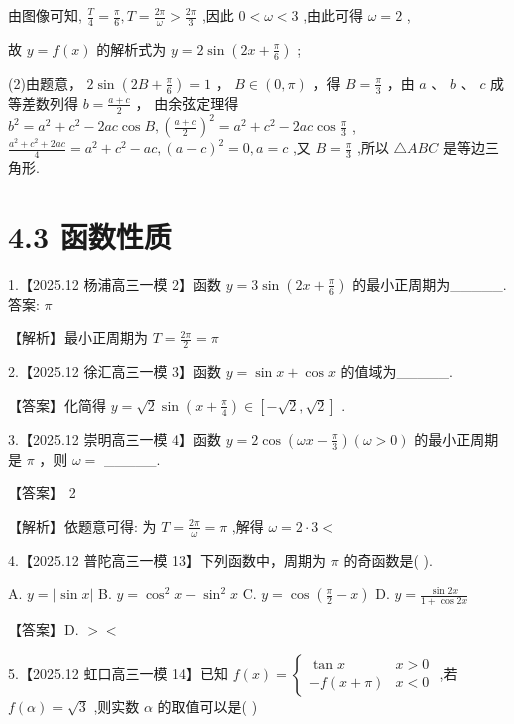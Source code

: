 \documentclass[10pt]{article}
\begin{document}
由图像可知, \(\frac{T}{4} = \frac{\pi }{6},T = \frac{2\pi }{\omega } > \frac{2\pi }{3}\) ,因此 \(0 < \omega  < 3\) ,由此可得 \(\omega  = 2\) ,

故 \(y = f\left( x\right)\) 的解析式为 \(y = 2\sin \left( {{2x} + \frac{\pi }{6}}\right)\) ;

(2)由题意， \(2\sin \left( {{2B} + \frac{\pi }{6}}\right)  = 1\) ， \(B \in  \left( {0,\pi }\right)\) ，得 \(B = \frac{\pi }{3}\) ，由 \(a\) 、 \(b\) 、 \(c\) 成等差数列得 \(b = \frac{a + c}{2}\) ， 由余弦定理得 \({b}^{2} = {a}^{2} + {c}^{2} - {2ac}\cos B,{\left( \frac{a + c}{2}\right) }^{2} = {a}^{2} + {c}^{2} - {2ac}\cos \frac{\pi }{3}\) , \(\frac{{a}^{2} + {c}^{2} + {2ac}}{4} = {a}^{2} + {c}^{2} - {ac},{\left( a - c\right) }^{2} = 0,a = c\) ,又 \(B = \frac{\pi }{3}\) ,所以 \(\bigtriangleup {ABC}\) 是等边三角形.

\section*{4.3 函数性质}

1.【2025.12 杨浦高三一模 2】函数 \(y = 3\sin \left( {{2x} + \frac{\pi }{6}}\right)\) 的最小正周期为\_\_\_\_\_. 答案: \(\pi\)

【解析】最小正周期为 \(T = \frac{2\pi }{2} = \pi\)

2.【2025.12 徐汇高三一模 3】函数 \(y = \sin x + \cos x\) 的值域为\_\_\_\_\_.

【答案】化简得 \(y = \sqrt{2}\sin \left( {x + \frac{\pi }{4}}\right)  \in  \left\lbrack  {-\sqrt{2},\sqrt{2}}\right\rbrack\) .

3.【2025.12 崇明高三一模 4】函数 \(y = 2\cos \left( {{\omega x} - \frac{\pi }{3}}\right) \left( {\omega  > 0}\right)\) 的最小正周期是 \(\pi\) ，则 \(\omega  =\) \_\_\_\_\_.

【答案】 2

【解析】依题意可得: 为 \(T = \frac{2\pi }{\omega } = \pi\) ,解得 \(\omega  = 2 \cdot  3 <\)

4.【2025.12 普陀高三一模 13】下列函数中，周期为 \(\pi\) 的奇函数是( ).

A. \(y = \left| {\sin x}\right|\) B. \(y = {\cos }^{2}x - {\sin }^{2}x\) C. \(y = \cos \left( {\frac{\pi }{2} - x}\right)\) D. \(y = \frac{\sin {2x}}{1 + \cos {2x}}\)

【答案】D. \(>  <\)

5.【2025.12 虹口高三一模 14】已知 \(f\left( x\right)  = \left\{  \begin{array}{ll} \tan x & x > 0 \\   - f\left( {x + \pi }\right) & x < 0 \end{array}\right.\) ,若 \(f\left( \alpha \right)  = \sqrt{3}\) ,则实数 \(\alpha\) 的取值可以是( )
\end{document}
